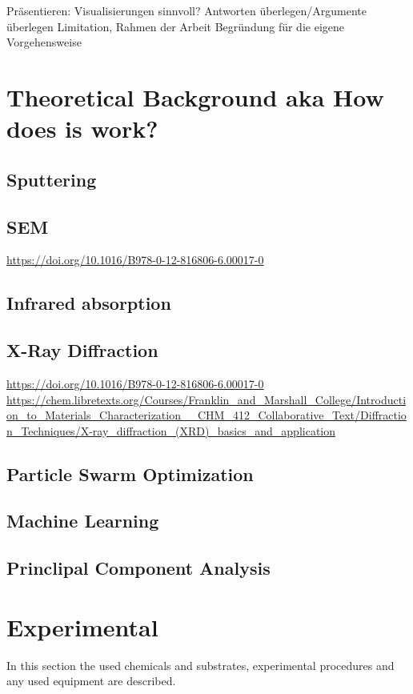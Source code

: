 \documentclass[a4paper]{article}
\begin{document}
Präsentieren: Visualisierungen sinnvoll? 
Antworten überlegen/Argumente überlegen
Limitation, Rahmen der Arbeit
Begründung für die eigene Vorgehensweise
\fi
\section{Theoretical Background aka How does is work?}
\subsection{Sputtering}
\subsection{SEM}
\url{https://doi.org/10.1016/B978-0-12-816806-6.00017-0}\\
\subsection{Infrared absorption}
\subsection{X-Ray Diffraction}
\url{https://doi.org/10.1016/B978-0-12-816806-6.00017-0}\\
\url{https://chem.libretexts.org/Courses/Franklin_and_Marshall_College/Introduction_to_Materials_Characterization__CHM_412_Collaborative_Text/Diffraction_Techniques/X-ray_diffraction_(XRD)_basics_and_application}\\
\subsection{Particle Swarm Optimization}
\subsection{Machine Learning}
\subsection{Princlipal Component Analysis}

\clearpage
\section{Experimental}
\label{sec:exp}
In this section the used chemicals and substrates, experimental procedures and any used equipment are described. 
\end{document}

